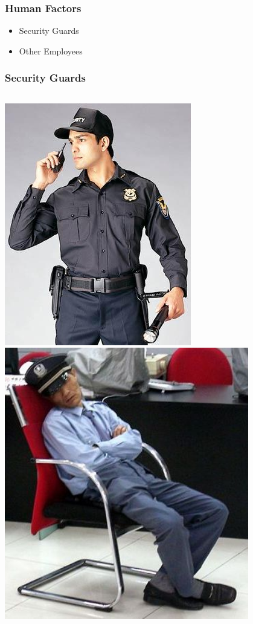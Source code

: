 \documentclass[]{beamer}
\begin{document}
\begin{frame}
  \frametitle{Human Factors}
\begin{itemize}
  \item Security Guards
  \item Other Employees

\end{itemize}
\end{frame}

\begin{frame}
  \frametitle{Security Guards}
  \begin{columns}[c]
    \includegraphics[width=.8\textwidth]{Security-Guard}
    \includegraphics[width=0.8\textwidth]{Security-Guard-Sleeping}
  \end{columns}


\end{frame}
\end{document}
